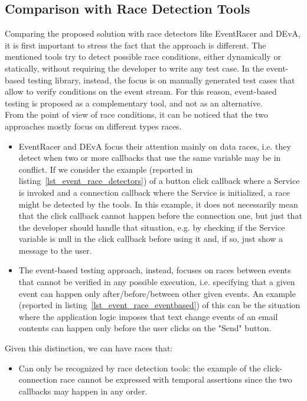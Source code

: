 \documentclass[11pt,a4paper,notitlepage]{article}
\begin{document}
{\subsection{Comparison with Race Detection Tools}
Comparing the proposed solution with race detectors like EventRacer and DEvA, it is first important to stress the fact that the approach is different. The mentioned tools try to detect possible race conditions, either dynamically or statically, without requiring the developer to write any test case. In the event-based testing library, instead, the focus is on manually generated test cases that allow to verify conditions on the event stream. For this reason, event-based testing is proposed as a complementary tool, and not as an alternative.\medskip \\
From the point of view of race conditions, it can be noticed that the two approaches mostly focus on different types races.
\begin{itemize}
	\item EventRacer and DEvA focus their attention mainly on data races, i.e. they detect when two or more callbacks that use the same variable may be in conflict. If we consider the example (reported in listing~\ref{lst_event_race_detectors}) of a button click callback where a Service is invoked and a connection callback where the Service is initialized, a race might be detected by the tools. In this example, it does not necessarily mean that the click callback cannot happen before the connection one, but just that the developer should handle that situation, e.g. by checking if the Service variable is null in the click callback before using it and, if so, just show a message to the user.
	\item The event-based testing approach, instead, focuses on races between events that cannot be verified in any possible execution, i.e. specifying that a given event can happen only after/before/between other given events. An example (reported in listing~\ref{lst_event_race_eventbased}) of this can be the situation where the application logic imposes that text change events of an email contents can happen only before the user clicks on the "Send" button.
\end{itemize}
Given this distinction, we can have races that:
\begin{itemize}
	\item Can only be recognized by race detection tools: the example of the click-connection race cannot be expressed with temporal assertions since the two callbacks may happen in any order.

\end{itemize}}
\end{document}
